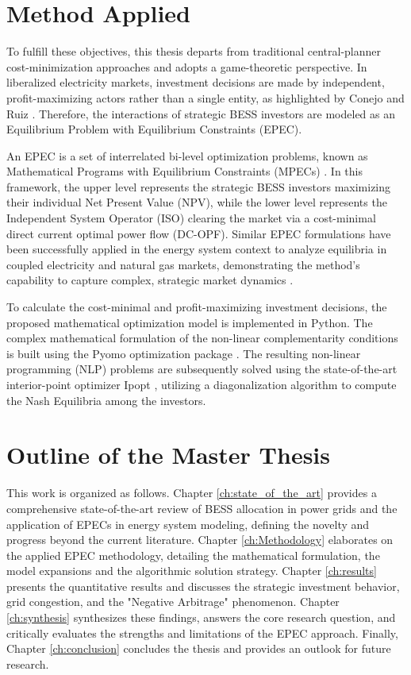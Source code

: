 \section{Method Applied}
To fulfill these objectives, this thesis departs from traditional central-planner cost-minimization approaches and adopts a game-theoretic perspective. In liberalized electricity markets, investment decisions are made by independent, profit-maximizing actors rather than a single entity, as highlighted by Conejo and Ruiz \cite{conejo_complementarity_2020}. Therefore, the interactions of strategic BESS investors are modeled as an Equilibrium Problem with Equilibrium Constraints (EPEC).

An EPEC is a set of interrelated bi-level optimization problems, known as Mathematical Programs with Equilibrium Constraints (MPECs) \cite{conejo_complementarity_2020}. In this framework, the upper level represents the strategic BESS investors maximizing their individual Net Present Value (NPV), while the lower level represents the Independent System Operator (ISO) clearing the market via a cost-minimal direct current optimal power flow (DC-OPF). Similar EPEC formulations have been successfully applied in the energy system context to analyze equilibria in coupled electricity and natural gas markets, demonstrating the method's capability to capture complex, strategic market dynamics \cite{chen_equilibria_2020}.

To calculate the cost-minimal and profit-maximizing investment decisions, the proposed mathematical optimization model is implemented in Python. The complex mathematical formulation of the non-linear complementarity conditions is built using the Pyomo optimization package \cite{pyomo_2021}. The resulting non-linear programming (NLP) problems are subsequently solved using the state-of-the-art interior-point optimizer Ipopt \cite{ipopt_2006}, utilizing a diagonalization algorithm to compute the Nash Equilibria among the investors.

\section{Outline of the Master Thesis}
This work is organized as follows. Chapter \ref{ch:state_of_the_art} provides a comprehensive state-of-the-art review of BESS allocation in power grids and the application of EPECs in energy system modeling, defining the novelty and progress beyond the current literature. Chapter \ref{ch:Methodology} elaborates on the applied EPEC methodology, detailing the mathematical formulation, the model expansions and the algorithmic solution strategy. Chapter \ref{ch:results} presents the quantitative results and discusses the strategic investment behavior, grid congestion, and the "Negative Arbitrage" phenomenon. Chapter \ref{ch:synthesis} synthesizes these findings, answers the core research question, and critically evaluates the strengths and limitations of the EPEC approach. Finally, Chapter \ref{ch:conclusion} concludes the thesis and provides an outlook for future research.


